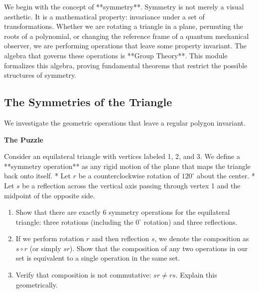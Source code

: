 \documentclass[12pt, a4paper]{article}
\newenvironment{puzzlebox}
  {\par\medskip\fillcolorbox{LightGold}{PuzzleColor}{The Puzzle}}
  {\par\medskip}
\newcommand{\fillcolorbox}[3]{%
  \noindent
  \filldrawbox{#1}{#2}{\textbf{\sffamily\color{white}#3}}\par\nobreak\vspace{4pt}
}
\newcommand{\filldrawbox}[3]{%
  \colorbox{#1}{\parbox{\dimexpr\linewidth-2\fboxsep\relax}{%
    \vspace{4pt}\noindent\hspace{4pt}#3\vspace{4pt}%
  }}%
}
\begin{document}
We begin with the concept of **symmetry**.
Symmetry is not merely a visual aesthetic. It is a mathematical property: invariance under a set of transformations.
Whether we are rotating a triangle in a plane, permuting the roots of a polynomial, or changing the reference frame of a quantum mechanical observer, we are performing operations that leave some property invariant.
The algebra that governs these operations is **Group Theory**.
This module formalizes this algebra, proving fundamental theorems that restrict the possible structures of symmetry.

\subsection{The Symmetries of the Triangle}

We investigate the geometric operations that leave a regular polygon invariant.

\begin{puzzlebox}
Consider an equilateral triangle with vertices labeled 1, 2, and 3.
We define a **symmetry operation** as any rigid motion of the plane that maps the triangle back onto itself.
* Let $r$ be a counterclockwise rotation of $120^\circ$ about the center.
* Let $s$ be a reflection across the vertical axis passing through vertex 1 and the midpoint of the opposite side.

\begin{center}
\end{center}

\begin{enumerate}[label=(\alph*), leftmargin=*]
  \item Show that there are exactly 6 symmetry operations for the equilateral triangle: three rotations (including the $0^\circ$ rotation) and three reflections.
  \item If we perform rotation $r$ and then reflection $s$, we denote the composition as $s \circ r$ (or simply $sr$).
        Show that the composition of any two operations in our set is equivalent to a single operation in the same set.
  \item Verify that composition is not commutative: $sr \neq rs$. Explain this geometrically.
\end{enumerate}
\end{puzzlebox}
\end{document}
